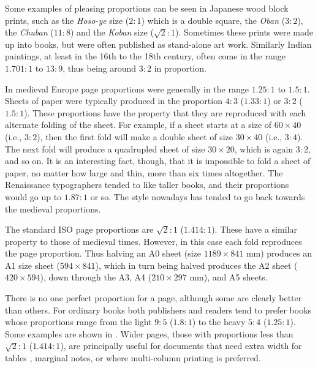 \documentclass[10pt,letterpaper]{memoir}
\begin{document}
    Some examples of pleasing proportions can be
seen in Japanese wood block prints, such as the \textit{Hoso-ye} size
($2 : 1$) which is a double square, the \textit{Oban} ($3 : 2$),
the \textit{Chuban} ($11 : 8$) and the \textit{Koban} size
($\sqrt{2} : 1$). Sometimes these prints were made up into books, but
were often published as stand-alone art work. Similarly Indian paintings,
at least in the 16th to the 18th century,
often come in the range $1.701 : 1$ to $13 : 9$, thus being around
$3 : 2$ in proportion.

    In medieval Europe page proportions were generally in the range
$1.25 : 1$ to $1.5 : 1$. Sheets of paper were typically 
produced in the
proportion $4 : 3$ ($1.33 : 1$) or $3 : 2$ ($1.5 : 1$). 
These proportions
have the property that they are reproduced with each alternate
folding of the sheet.
For example, if a sheet starts at a size of $60 \times 40$ 
(i.e., $3 : 2$),
then the first fold will make a double sheet of size $30 \times 40$
(i.e., $3 : 4$). The next fold will produce a quadrupled sheet of size
$30 \times 20$, which is again $3 : 2$, and so on. 
It is an interesting fact,
though, that it is impossible to fold a sheet of paper, no matter how large 
and thin, more than six times altogether. The Renaissance typographers
tended to like taller books, and their proportions would go up 
to $1.87 : 1$
or so. The style nowadays has tended to go back towards the medieval
proportions.

    The standard ISO page proportions are $\sqrt{2} : 1$ 
($1.414 : 1$). These
have a similar property to those of medieval times. However, in this case
each fold reproduces the page proportion. Thus halving an A0 sheet 
(size $1189 \times 841$ mm) produces an A1 size sheet ($594 \times 841$),
which in turn being halved produces the A2 sheet ($420 \times 594$), down
through the A3, A4 ($210 \times 297$ mm), and A5 sheets.

   There is no one perfect proportion for a page, although some are 
clearly better
than others. For ordinary books both publishers and readers tend to prefer
books whose proportions range from the light $9 : 5$ ($1.8 : 1$) 
to the heavy
$5 : 4$ ($1.25 : 1$). Some examples are shown in .
 Wider pages, those with proportions less than
$\sqrt{2} : 1$ ($1.414 : 1$), 
are principally useful for documents that need
extra width for tables
, marginal notes, or where multi-column printing
is preferred. 
\end{document}
